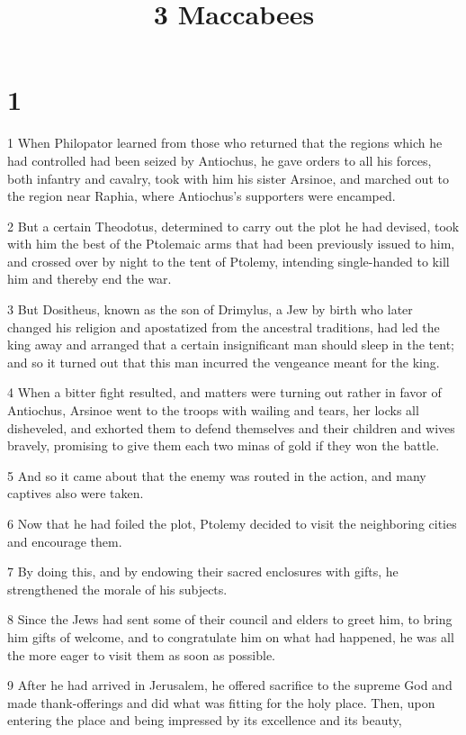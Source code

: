

\title{3 Maccabees}


\chapter{1}

\par 1 When Philopator learned from those who returned that the regions which he had controlled had been seized by Antiochus, he gave orders to all his forces, both infantry and cavalry, took with him his sister Arsinoe, and marched out to the region near Raphia, where Antiochus's supporters were encamped.
\par 2 But a certain Theodotus, determined to carry out the plot he had devised, took with him the best of the Ptolemaic arms that had been previously issued to him, and crossed over by night to the tent of Ptolemy, intending single-handed to kill him and thereby end the war.
\par 3 But Dositheus, known as the son of Drimylus, a Jew by birth who later changed his religion and apostatized from the ancestral traditions, had led the king away and arranged that a certain insignificant man should sleep in the tent; and so it turned out that this man incurred the vengeance meant for the king.
\par 4 When a bitter fight resulted, and matters were turning out rather in favor of Antiochus, Arsinoe went to the troops with wailing and tears, her locks all disheveled, and exhorted them to defend themselves and their children and wives bravely, promising to give them each two minas of gold if they won the battle.
\par 5 And so it came about that the enemy was routed in the action, and many captives also were taken.
\par 6 Now that he had foiled the plot, Ptolemy decided to visit the neighboring cities and encourage them.
\par 7 By doing this, and by endowing their sacred enclosures with gifts, he strengthened the morale of his subjects.
\par 8 Since the Jews had sent some of their council and elders to greet him, to bring him gifts of welcome, and to congratulate him on what had happened, he was all the more eager to visit them as soon as possible.
\par 9 After he had arrived in Jerusalem, he offered sacrifice to the supreme God and made thank-offerings and did what was fitting for the holy place. Then, upon entering the place and being impressed by its excellence and its beauty,
